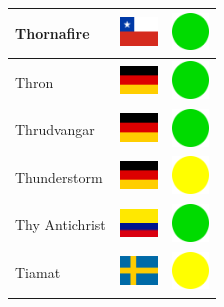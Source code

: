 \documentclass[12pt, a4paper, twoside]{report}
\begin{document}
\begin{center}
\begin{longtable}{|p{5cm}|p{2cm}|p{2cm}|}
 Thornafire                                                 & \includegraphics[width=1cm]{4x3/cl} &   \includegraphics[width=1cm]{likes/y} \\ \hline
 Thron                                                      & \includegraphics[width=1cm]{4x3/de} &   \includegraphics[width=1cm]{likes/y} \\ \hline
 Thrudvangar                                                & \includegraphics[width=1cm]{4x3/de} &   \includegraphics[width=1cm]{likes/y} \\ \hline
 Thunderstorm                                               & \includegraphics[width=1cm]{4x3/de} &   \includegraphics[width=1cm]{likes/m} \\ \hline
 Thy Antichrist                                             & \includegraphics[width=1cm]{4x3/co} &   \includegraphics[width=1cm]{likes/y} \\ \hline
 Tiamat                                                     & \includegraphics[width=1cm]{4x3/se} &   \includegraphics[width=1cm]{likes/m} \\ \hline

\end{longtable}
\end{center}
\end{document}
